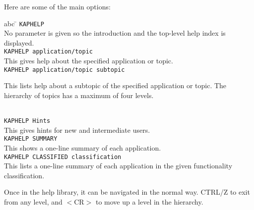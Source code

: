{{{      Here are some of the main options:
      \begin{tabbing}
      abc \= \kill
      {\tt KAPHELP} \\
      \> No parameter is given so the introduction and the top-level
         help index is displayed.
      \\
      {\tt KAPHELP application/topic} \\
         \>   This gives help about the specified application or topic. \\
      {\tt KAPHELP application/topic subtopic} \\
      \> \begin{minipage}[t]{143mm}
            This lists help about a subtopic of the specified
            application or topic. The hierarchy of topics has a maximum
            of four levels.
      \end{minipage}
      \\
      {\tt KAPHELP Hints} \\
         \>   This gives hints for new and intermediate users. \\
      {\tt KAPHELP SUMMARY} \\
         \>   This shows a one-line summary of each application. \\
      {\tt KAPHELP CLASSIFIED classification} \\
         \>   This lists a one-line summary of each application in the
            given functionality classification. \\
      \end{tabbing}

      Once in the help library, it can be navigated in the normal
      way.  CTRL/Z to exit from any level, and $<$CR$>$ to move up a
      level in the hierarchy.
   }
   }}
